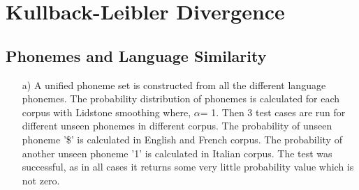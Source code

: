 \documentclass{article}
\begin{document}
\section{Kullback-Leibler Divergence}
\subsection{Phonemes and Language Similarity}
\begin{itemize}
	\item[a)]
	A unified phoneme set is constructed from all the different language phonemes. The probability distribution of phonemes is calculated for each corpus with Lidstone smoothing where, $\alpha $= 1. Then 3 test cases are run for different unseen phonemes in different corpus. The probability of unseen phoneme '\$' is calculated in English and French corpus. The probability of another unseen phoneme '1' is calculated in Italian corpus. The test was successful, as in all cases it returns some very little probability value which is not zero. \:
	

\end{itemize}
\end{document}
